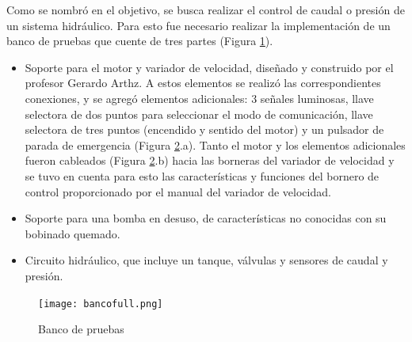 Como se nombró en el objetivo, se busca realizar el control de caudal o presión de un sistema hidráulico. Para esto fue necesario realizar la implementación de un banco de pruebas que cuente de tres partes (Figura \ref{fig:bancofull}).
\begin{itemize}
	\item Soporte para el motor y variador de velocidad,  diseñado y construido por el profesor Gerardo Arthz. A estos elementos se realizó las correspondientes conexiones, y se agregó elementos adicionales: 3 señales luminosas, llave selectora de dos puntos para seleccionar el modo de comunicación, llave selectora de tres puntos (encendido y sentido del motor) y un pulsador de parada de emergencia (Figura \ref{fig:banco}.a).
	Tanto el motor y los elementos adicionales fueron cableados (Figura \ref{fig:banco}.b) hacia las borneras del variador de velocidad y se tuvo en cuenta para esto las características y funciones del bornero de control proporcionado por el manual del variador de velocidad\cite{InstaManual}. 
	
	\item Soporte para una bomba en desuso, de características no conocidas con su bobinado quemado.
	\item Circuito hidráulico, que incluye un tanque, válvulas y sensores de caudal y presión.
\end{itemize}




\begin{figure}[htb]
	\centering
	\texttt{[image: bancofull.png]}
	\label{fig:bancofull}
\end{figure}


\begin{figure}[H]
	\centering
	\caption{Banco de pruebas} \label{fig:banco}
\end{figure}

